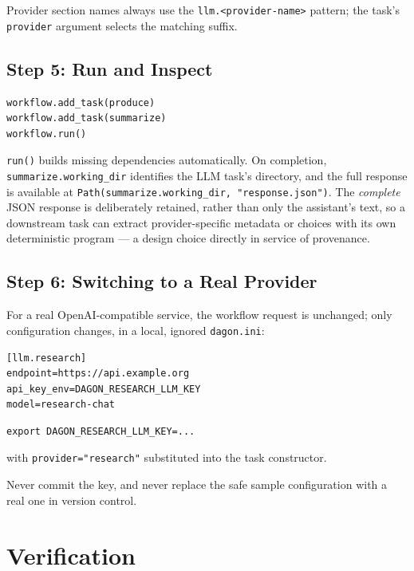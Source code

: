 Provider section names always use the \texttt{llm.<provider-name>} pattern;
the task's \texttt{provider} argument selects the matching suffix.

\subsection{Step 5: Run and Inspect}

\begin{lstlisting}
workflow.add_task(produce)
workflow.add_task(summarize)
workflow.run()
\end{lstlisting}

\texttt{run()} builds missing dependencies automatically. On completion,
\texttt{summarize.working\_dir} identifies the LLM task's directory, and the
full response is available at \texttt{Path(summarize.working\_dir, "response.json")}.
The \emph{complete} JSON response is deliberately retained, rather than only
the assistant's text, so a downstream task can extract provider-specific
metadata or choices with its own deterministic program --- a design choice
directly in service of provenance.

\subsection{Step 6: Switching to a Real Provider}

For a real OpenAI-compatible service, the workflow request is unchanged; only
configuration changes, in a local, ignored \texttt{dagon.ini}:

\begin{lstlisting}[style=ini]
[llm.research]
endpoint=https://api.example.org
api_key_env=DAGON_RESEARCH_LLM_KEY
model=research-chat
\end{lstlisting}

\begin{lstlisting}[style=bash]
export DAGON_RESEARCH_LLM_KEY=...
\end{lstlisting}

with \texttt{provider="research"} substituted into the task constructor.
\begin{cautionbox}
Never commit the key, and never replace the safe sample configuration with a
real one in version control.
\end{cautionbox}

\section{Verification}

